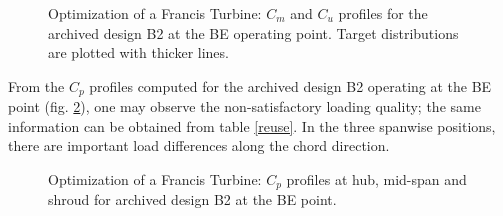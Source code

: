 \begin{figure}[h!]
\begin{minipage}[b]{1\linewidth}
 \centering
\end{minipage}
\caption{Optimization of a Francis Turbine: $C_m$ and $C_u$ profiles for the archived design B2 at the BE operating point. Target distributions are plotted with thicker lines.}
\label{Francis-B2-OUT}
\end{figure}

From the $C_p$ profiles computed for the archived design B2 operating at the BE point (fig. \ref{Francis-B2-LOAD}), one may observe the non-satisfactory loading quality; the same information can be obtained from table \ref{reuse}. In the three spanwise positions, there are important load differences along the chord direction. 

\begin{figure}[h!]
\begin{minipage}[b]{1\linewidth}
 \centering
\end{minipage}
\caption{Optimization of a Francis Turbine: $C_p$ profiles at hub, mid-span and shroud for archived design B2 at the BE point.}
\label{Francis-B2-LOAD}
\end{figure}

